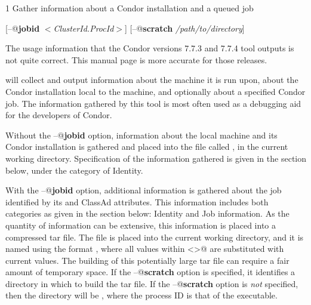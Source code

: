 \begin{ManPage}{\label{man-condor-gather-info}}{1}
{Gather information about a Condor installation and a queued job}
\Synopsis

[\verb@--@\textbf{jobid} \textit{$<$ClusterId.ProcId$>$}]
[\verb@--@\textbf{scratch} \textit{/path/to/directory}]


\Description

\Note  The usage information that the 
Condor versions 7.7.3 and 7.7.4  tool outputs
is not quite correct.
This manual page is more accurate for those releases.

 will collect and output information 
about the machine it is run upon,
about the Condor installation local to the machine, 
and optionally about a specified Condor job. 
The information gathered by this tool is most often used as a debugging aid
for the developers of Condor.

Without the \verb@--@\textbf{jobid} option, information about the
local machine and its Condor installation is gathered and
placed into the file called ,
in the current working directory. 
Specification of the information gathered is given in 
the  section below, 
under the category of Identity.

With the \verb@--@\textbf{jobid} option, 
additional information is gathered about the job identified by
its  and  ClassAd attributes.
This information includes both categories as given in
the  section below:
Identity and Job information.
As the quantity of information can be extensive,
this information is placed into a compressed tar file.
The file is placed into the current working directory,
and it is named using the format
, where all values within \verb@<>@ are substituted
with current values.
The building of this potentially large tar file can require a fair
amount of temporary space.
If the \verb@--@\textbf{scratch} option is specified,
it identifies a directory in which to build the tar file.
If the \verb@--@\textbf{scratch} option is \emph{not} specified, 
then the directory will be ,
where the process ID is that of the  executable.



\end{ManPage}
